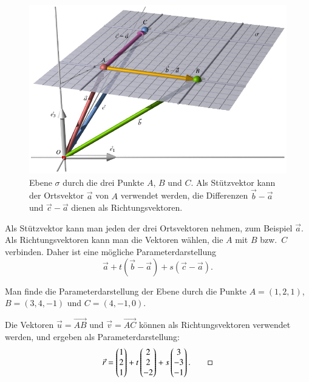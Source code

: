 \begin{figure}
\centering
\includegraphics{3/images/ebene3punkte.pdf}
\caption{Ebene $\sigma $ durch die drei Punkte $A$, $B$ und $C$.
Als Stützvektor kann der Ortsvektor $\vec{a}$ von $A$ verwendet werden,
die Differenzen $\vec{b}-\vec{a}$ und $\vec{c}-\vec{a}$ dienen als
Richtungsvektoren.
\label{skript:affin:ebene3punkte}}
\end{figure}
Als Stützvektor kann man jeden der drei Ortsvektoren nehmen, zum Beispiel
$\vec{a}$.
Als Richtungsvektoren kann man die Vektoren wählen, die $A$ mit $B$ bzw.~$C$
verbinden.
Daher ist eine mögliche Parameterdarstellung
\[
\vec{a} + t (\vec{b}-\vec{a}) + s(\vec{c}-\vec{a}).
\]

\begin{beispiel}
Man finde die Parameterdarstellung der Ebene durch die Punkte
$A=(1,2,1)$,
$B=(3,4,-1)$ und
$C=(4,-1,0)$.

\smallskip

{\parindent 0pt Die} Vektoren $\vec u=\overrightarrow{AB}$ und
$\vec v=\overrightarrow{AC}$ können als Richtungsvektoren
verwendet werden, und ergeben als Parameterdarstellung:
\begin{equation}
\vec r=\begin{pmatrix}1\\2\\1 \end{pmatrix}
+
t\begin{pmatrix}2\\2\\-2\end{pmatrix}
+
s\begin{pmatrix}3\\-3\\-1\end{pmatrix}.
\label{beispielebene}
\qedhere
\end{equation}
\end{beispiel}

